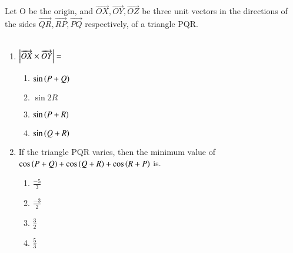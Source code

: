 \iffalse
  \title{Trignometric Functions and Equations}
  \author{EE24BTECH11006- Arnav Mahishi}
  \section{paragraph}
\fi

\item{

Let O be the origin, and $\overrightarrow{OX},\overrightarrow{OY},\overrightarrow{OZ}$ be three unit vectors in the directions of the sides $\overrightarrow{QR},\overrightarrow{RP},\overrightarrow{PQ}$ respectively, of a triangle PQR.\hfill{}\\\\
\begin{enumerate}
	\item {$\left\vert\overrightarrow{OX}\times\overrightarrow{OY}\right\vert=$
	\begin{enumerate}[label=(\alph*)]
		\item$\sin\left(P+Q\right)$ 
		\item$\sin2R$
		\item$\sin\left(P+R\right)$
		\item$\sin\left(Q+R\right)$
	\end{enumerate}}

	\item {If the triangle PQR varies, then the minimum value of $\cos\left(P+Q\right)+\cos\left(Q+R\right)+\cos\left(R+P\right)$ is.
	\begin{enumerate}[label=(\alph*)]
		\item$\frac{-5}{3}$
		\item$\frac{-3}{2}$
		\item$\frac{3}{2}$
		\item$\frac{5}{3}$
	\end{enumerate}}
\end{enumerate}
}
